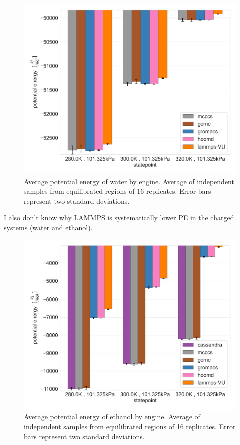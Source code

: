 \begin{figure}[h!]
    \centering
    \includegraphics[width=0.8\linewidth,keepaspectratio]{figures/rep_study/waterSPCE_pe_summary.png}
    \caption{Average potential energy of water by engine. Average of independent samples from equilibrated regions of 16 replicates. Error bars represent two standard deviations.}\label{fig:water_pe}
\end{figure}
I also don't know why LAMMPS is systematically lower PE in the charged systems (water and ethanol).
\begin{figure}[h!]
    \centering
    \includegraphics[width=0.8\linewidth,keepaspectratio]{figures/rep_study/ethanolAA_pe_summary.png}
    \caption{Average potential energy of ethanol by engine. Average of independent samples from equilibrated regions of 16 replicates. Error bars represent two standard deviations.}\label{fig:ethanol_pe}
\end{figure}

